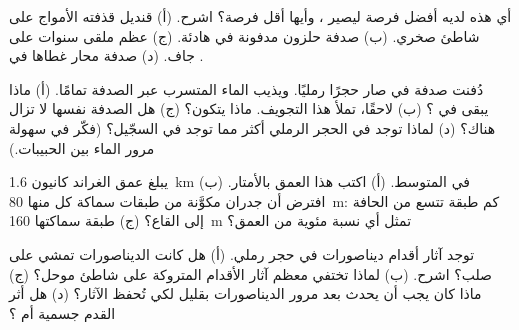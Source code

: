 \begin{exercise}[$\star\star$]\label{exo:g7:sediments-and-fossils:7}
أي هذه لديه أفضل فرصة ليصير ، وأيها أقل فرصة؟ اشرح. (أ) قنديل 
قذفته الأمواج على شاطئ صخري. (ب) صدفة حلزون مدفونة في   هادئة.
(ج) عظم ملقى سنوات على  جاف. (د) صدفة محار غطاها  في  .
\end{exercise}

\begin{exercise}[$\star\star$]\label{exo:g7:sediments-and-fossils:8}
دُفنت صدفة في  صار حجرًا رمليًا. ويذيب الماء المتسرب عبر  الصدفة
تمامًا. (أ) ماذا يبقى في ؟ (ب) لاحقًا، تملأ  هذا التجويف. ماذا
يتكون؟ (ج) هل الصدفة نفسها لا تزال هناك؟ (د) لماذا توجد  
في الحجر الرملي أكثر مما توجد في السجّيل؟ (فكّر في سهولة مرور الماء بين
الحبيبات.)
\end{exercise}

\begin{exercise}[$\star\star$]\label{exo:g7:sediments-and-fossils:9}
يبلغ عمق الغراند كانيون \qty{1.6}{km} في المتوسط. (أ) اكتب هذا العمق
بالأمتار. (ب) افترض أن جدران  مكوَّنة من طبقات سماكة كل منها
\qty{80}{m}: كم طبقة تتسع من الحافة إلى القاع؟ (ج) طبقة سماكتها
\qty{160}{m} تمثل أي نسبة مئوية من العمق؟
\end{exercise}

\begin{exercise}[$\star\star$]\label{exo:g7:sediments-and-fossils:10}
توجد آثار أقدام ديناصورات في حجر رملي. (أ) هل كانت الديناصورات تمشي على
 صلب؟ اشرح. (ب) لماذا تختفي معظم آثار الأقدام المتروكة على شاطئ موحل؟
(ج) ماذا كان يجب أن يحدث بعد مرور الديناصورات بقليل لكي تُحفظ الآثار؟
(د) هل أثر القدم  جسمية أم ؟
\end{exercise}

